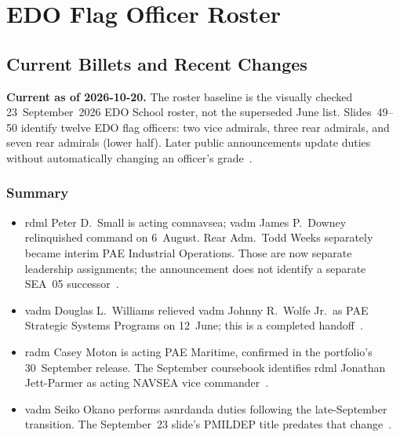 \documentclass[../main.tex]{subfiles}
\begin{document}
\chapter{EDO Flag Officer Roster}\label{app:edo-flags}

\section{Current Billets and Recent Changes}
\textbf{Current as of 2026-10-20.} The roster baseline is the visually checked 23~September~2026 EDO School roster, not the superseded June list. Slides~49--50 identify twelve EDO flag officers: two vice admirals, three rear admirals, and seven rear admirals (lower half). Later public announcements update duties without automatically changing an officer's grade~\autocite[slides 49--50]{edo-2-1-1-command-structures-2025}.

\subsection{Summary}
\begin{itemize}
  \item \ac{rdml} Peter D.\ Small is acting \ac{comnavsea}; \ac{vadm} James P.\ Downey relinquished command on 6~August. Rear Adm.\ Todd Weeks separately became interim PAE Industrial Operations. Those are now separate leadership assignments; the announcement does not identify a separate SEA~05 successor~\autocite{DVIDS-Small-NAVSEA-Aug2026,DVIDS-Weeks-PAEIO-Aug2026}.
  \item \ac{vadm} Douglas L.\ Williams relieved \ac{vadm} Johnny R.\ Wolfe Jr.\ as PAE Strategic Systems Programs on 12~June; this is a completed handoff~\autocite{DVIDS-SSP-Handoff-Jun2026}.
  \item \ac{radm} Casey Moton is acting PAE Maritime, confirmed in the portfolio's 30~September release. The September coursebook identifies \ac{rdml} Jonathan Jett-Parmer as acting NAVSEA vice commander~\autocite{PAE-Maritime-Moton-Sep2026,edo-2-1-1-command-structures-2025}.
  \item \ac{vadm} Seiko Okano performs \ac{asnrdanda} duties following the late-September transition. The September~23 slide's PMILDEP title predates that change~\autocite{ExecutiveGov-ASNRDA-Sep2026,DONCIO-Okano-PTDO-2026}.
\end{itemize}
\end{document}
